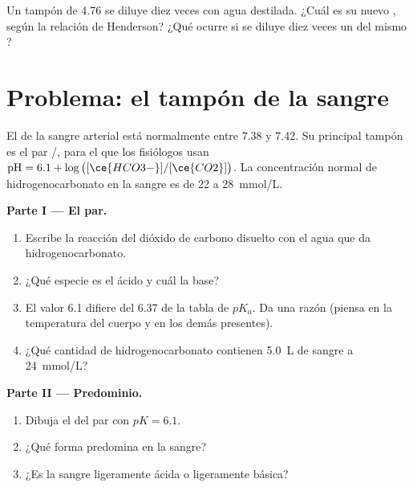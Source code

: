 \begin{exercise}[$\star\star\star$]\label{exo:g12:buffers-predominance:15}
Un tampón de  4.76 se diluye diez veces con agua destilada. ¿Cuál es su
nuevo , según la relación de Henderson? ¿Qué ocurre si se diluye diez
veces un  del mismo ?
\end{exercise}

\section{Problema: el tampón de la sangre}

\begin{problem}
\label{pb:g12:buffers-predominance:1}
El  de la sangre arterial está normalmente entre 7.38 y 7.42. Su
principal tampón es el par /, para el que los
fisiólogos usan $\mathrm{pH} = 6.1 + \log\big([\ce{HCO3-}]/[\ce{CO2}]\big)$.
La concentración normal de hidrogenocarbonato en la sangre es de 22 a
\qty{28}{mmol/L}.

\medskip
\noindent\textbf{Parte I --- El par.}
\begin{enumerate}
  \item Escribe la reacción del dióxido de carbono disuelto con el agua
        que da  hidrogenocarbonato.
  \item ¿Qué especie es el ácido y cuál la base?
  \item El valor 6.1 difiere del 6.37 de la tabla de $pK_a$. Da una razón
        (piensa en la temperatura del cuerpo y en los demás 
        presentes).
  \item ¿Qué cantidad de hidrogenocarbonato contienen \qty{5.0}{L} de
        sangre a \qty{24}{mmol/L}?
\end{enumerate}

\medskip
\noindent\textbf{Parte II --- Predominio.}
\begin{enumerate}[resume]
  \item Dibuja el  del par con $pK = 6.1$.
  \item ¿Qué forma predomina en la sangre?
  \item ¿Es la sangre ligeramente ácida o ligeramente básica?
\end{enumerate}


\end{problem}
